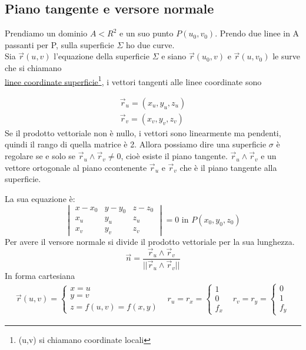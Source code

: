 \documentclass{book}
\begin{document}
\subsection{Piano tangente e versore normale}
Prendiamo un dominio $A<R^2$ e un suo punto $P(u_0,v_0)$. Prendo due linee in A
passanti per P, sulla superficie $\Sigma$ ho due curve.\\
Sia $\vec{r}(u,v)$ l'equazione della superficie $\Sigma$ e siano
$\vec{r}(u_0,v)$  e $\vec{r}(u,v_0)$ le surve che si chiamano\\ \underline{linee
coordinate superficie}\footnote{(u,v) si chiamano coordinate locali}, i vettori
tangenti alle linee coordinate sono 
\begin{multicols}{2}
	\begin{equation*}
	\begin{matrix}
		\vec{r}_u=(x_u,y_u,z_u)\\
		\vec{r}_v=(x_v,y_v,z_v)
	\end{matrix}
	\end{equation*}
	Se il prodotto vettoriale non è nullo, i vettori sono linearmente ma
	pendenti, quindi il rango di quella matrice è 2. Allora possiamo dire una
	superficie $\sigma$ è regolare se e solo se $\vec{r}_u\wedge \vec{r}_v\neq
	0$, cioè esiste il {\color{red}piano tangente}. $\vec{r}_u\wedge \vec{r}_v$
	e un vettore ortogonale al piano ccontenente $\vec{r}_u$ e $\vec{r}_v$ che
	è il {\color{red}piano tangente} alla superficie.
\end{multicols}
La sua equazione è:\begin{equation*}
	\begin{vmatrix}
		x-x_0 & y-y_0 & z-z_0\\
		x_u & y_u & z_u\\
		x_v & y_v & z_v
	\end{vmatrix} =0\text{ in }P(x_0,y_0,z_0)
\end{equation*}
Per avere il {\color{red}versore normale} si divide il prodotto vettoriale per
la sua lunghezza.
\begin{equation*}
	\vec{n}=\frac{\vec{r}_u \wedge \vec{r}_v}{||\vec{r}_u\wedge \vec{r}_v||}
\end{equation*}
In forma cartesiana
\begin{equation*}
	\begin{matrix}
		\vec{r}(u, v) = \begin{cases}
			x=u\\
			y=v\\
			z=f(u, v)=f(x,y) 
		\end{cases}&r_u=r_x=\begin{cases}
			1 \\
			0\\
			f_x
		\end{cases} & r_v=r_y=\begin{cases}
			0\\
			1\\
			f_y
		\end{cases}
	\end{matrix}
\end{equation*}
\end{document}
